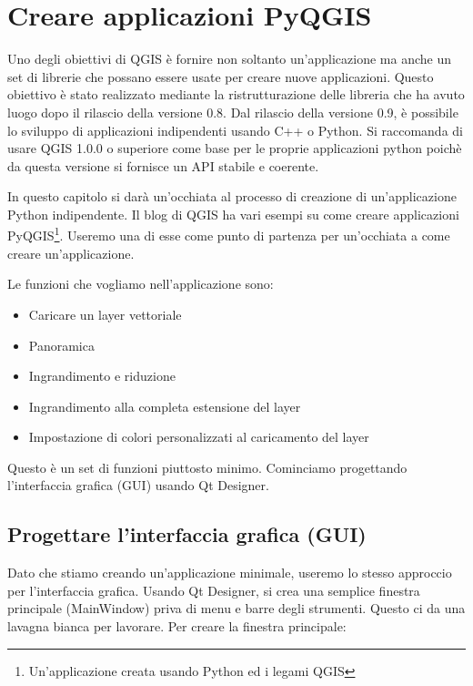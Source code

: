 
\section{Creare applicazioni PyQGIS}


Uno degli obiettivi di QGIS è fornire non soltanto un'applicazione ma anche un set di librerie che possano essere usate per creare nuove applicazioni. Questo obiettivo è stato realizzato mediante la ristrutturazione delle libreria che ha avuto luogo dopo il rilascio della versione 0.8. Dal rilascio della versione 0.9, è possibile lo sviluppo di applicazioni indipendenti usando C++ o Python. Si raccomanda di usare QGIS 1.0.0 o superiore come base per le proprie applicazioni python poichè da questa versione si fornisce un API stabile e coerente.

In questo capitolo si darà un'occhiata al processo di creazione di un'applicazione Python indipendente. Il blog di QGIS ha vari esempi su come creare applicazioni PyQGIS\footnote{Un'applicazione creata usando Python ed i legami QGIS}. Useremo una di esse come punto di partenza per un'occhiata a come creare un'applicazione.

Le funzioni che vogliamo nell'applicazione sono:

\begin{itemize}
\item Caricare un layer vettoriale
\item Panoramica
\item Ingrandimento e riduzione
\item Ingrandimento alla completa estensione del layer
\item Impostazione di colori personalizzati al caricamento del layer
\end{itemize} 

Questo è un set di funzioni piuttosto minimo. Cominciamo progettando l'interfaccia grafica (GUI) usando Qt Designer.

\subsection{Progettare l'interfaccia grafica (GUI)}

Dato che stiamo creando un'applicazione minimale, useremo lo stesso approccio per l'interfaccia grafica. Usando Qt Designer, si crea una semplice finestra principale (MainWindow) priva di menu e barre degli strumenti. Questo ci da una lavagna bianca per lavorare. Per creare la finestra principale:

